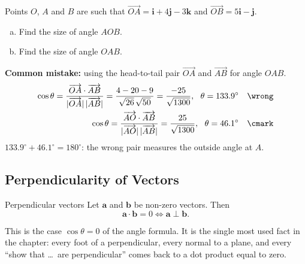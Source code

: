 \begin{example}[label=ex:2.2]
Points $O$, $A$ and $B$ are such that $\overrightarrow{OA} = \mathbf{i} + 4\mathbf{j} - 3\mathbf{k}$ and $\overrightarrow{OB} = 5\mathbf{i} - \mathbf{j}$.
\begin{enumerate}[(a)]
  \item Find the size of angle $AOB$.
  \item Find the size of angle $OAB$.
\end{enumerate}
\end{example}

\begin{mistake}
\textbf{Common mistake:} using the head-to-tail pair $\overrightarrow{OA}$ and $\overrightarrow{AB}$ for angle $OAB$.
\begin{align*}
\cos\theta = \dfrac{\overrightarrow{OA}\cdot\overrightarrow{AB}}{|\overrightarrow{OA}|\,|\overrightarrow{AB}|} = \dfrac{4-20-9}{\sqrt{26}\,\sqrt{50}} = \dfrac{-25}{\sqrt{1300}},\ \ \theta = 133.9^{\circ} & & \wrong \\
\cos\theta = \dfrac{\overrightarrow{AO}\cdot\overrightarrow{AB}}{|\overrightarrow{AO}|\,|\overrightarrow{AB}|} = \dfrac{25}{\sqrt{1300}},\ \ \theta = 46.1^{\circ} & & \cmark
\end{align*}
$133.9^{\circ} + 46.1^{\circ} = 180^{\circ}$: the wrong pair measures the outside angle at $A$.
\end{mistake}

\clearpage
\subsection{Perpendicularity of Vectors}
\begin{definition}{Perpendicular vectors}
Let $\mathbf{a}$ and $\mathbf{b}$ be non-zero vectors. Then
\[
\mathbf{a}\cdot\mathbf{b} = 0 \iff \mathbf{a}\perp\mathbf{b}.
\]
\end{definition}
This is the case $\cos\theta = 0$ of the angle formula. It is the single most used fact in the chapter: every foot of a perpendicular, every normal to a plane, and every ``show that \ldots\ are perpendicular'' comes back to a dot product equal to zero.

